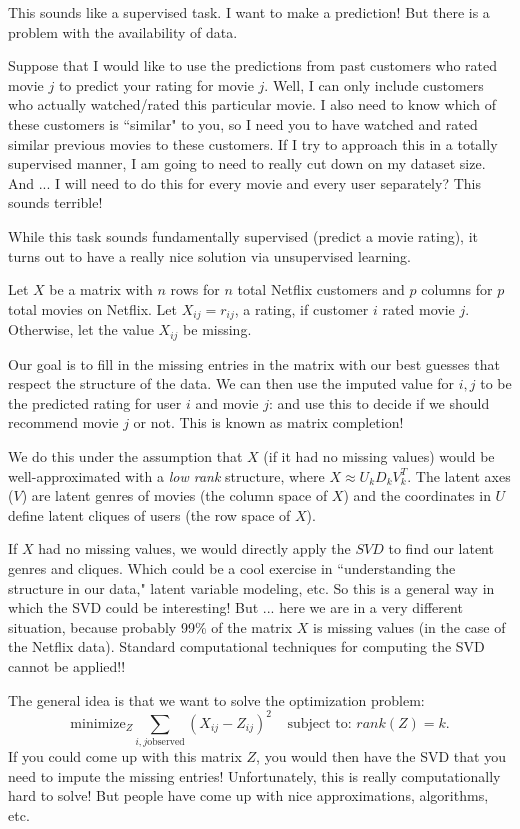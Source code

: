 This sounds like a supervised task. I want to make a prediction! But there is a problem with the availability of data.

Suppose that I would like to use the predictions from past customers who rated movie $j$ to predict your rating for movie $j$. Well, I can only include customers who actually watched/rated this particular movie. I also need to know which of these customers is ``similar" to you, so I need you to have watched and rated similar previous movies to these customers. If I try to approach this in a totally supervised manner, I am going to need to really cut down on my dataset size. And ... I will need to do this for every movie and every user separately? This sounds terrible!

While this task sounds fundamentally supervised (predict a movie rating), it turns out to have a really nice solution via unsupervised learning. 

Let $X$ be a matrix with $n$ rows for $n$ total Netflix customers and $p$ columns for $p$ total movies on Netflix. Let $X_{ij} = r_{ij}$, a rating, if customer $i$ rated movie $j$. Otherwise, let the value $X_{ij}$ be missing.

Our goal is to fill in the missing entries in the matrix with our best guesses that respect the structure of the data. We can then use the imputed value for $i,j$ to be the predicted rating for user $i$ and movie $j$: and use this to decide if we should recommend movie $j$ or not. This is known as matrix completion! 

We do this under the assumption that $X$ (if it had no missing values) would be well-approximated with a \emph{low rank} structure, where $X \approx U_kD_k V_k^T$. The latent axes ($V$) are latent genres of movies (the column space of $X$) and the coordinates in $U$ define latent cliques of users (the row space of $X$). 

If $X$ had no missing values, we would directly apply the $SVD$ to find our latent genres and cliques. Which could be a cool exercise in ``understanding the structure in our data," latent variable modeling, etc. So this is a general way in which the SVD could be interesting! But ... here we are in a very different situation, because probably 99\% of the matrix $X$ is missing values (in the case of the Netflix data). Standard computational techniques for computing the SVD cannot be applied!!

The general idea is that we want to solve the optimization problem:
$$
\mathrm{minimize}_Z \sum_{i,j \mathrm{observed}} (X_{ij} - Z_{ij})^2 \ \ \ \ \ \text{subject to: } rank(Z)=k. 
$$
If you could come up with this matrix $Z$, you would then have the SVD that you need to impute the missing entries! Unfortunately, this is really computationally hard to solve! But people have come up with nice approximations, algorithms, etc. 

